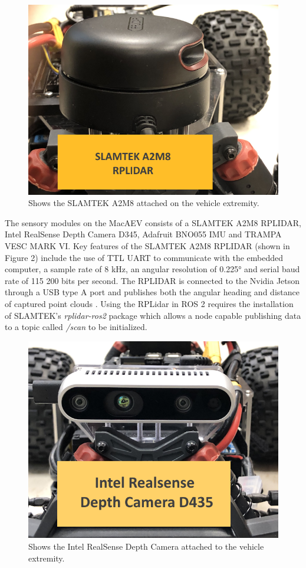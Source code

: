 \documentclass[conference]{IEEEtran}
\begin{document}
\begin{figure}
    \centering
    \includegraphics[scale=0.2]{lidar_diagram.png}
    \caption{Shows the SLAMTEK A2M8 attached on the vehicle extremity.}
    \label{Figure 2}
\end{figure}

The sensory modules on the MacAEV consists of a SLAMTEK A2M8 RPLIDAR, Intel RealSense Depth Camera D345, Adafruit BNO055 IMU and TRAMPA VESC MARK VI. Key features of the SLAMTEK A2M8 RPLIDAR (shown in Figure 2) include the use of TTL UART to communicate with the embedded computer, a sample rate of 8 kHz, an angular resolution of \ang{0.225} and serial baud rate of 115 200 bits per second. The RPLIDAR is connected to the Nvidia Jetson through a USB type A port and publishes both the angular heading and distance of captured point clouds \cite{b6}. Using the RPLidar in ROS 2 requires the installation of SLAMTEK's \textit{rplidar-ros2} package which allows a node capable publishing data to a topic called \textit{/scan} to be initialized.

\begin{figure}
    \centering
    \includegraphics[scale=0.25]{realsense_diagram.png}
    \caption{Shows the Intel RealSense Depth Camera attached to the vehicle extremity.}
    \label{Figure 3}
\end{figure}
\end{document}
